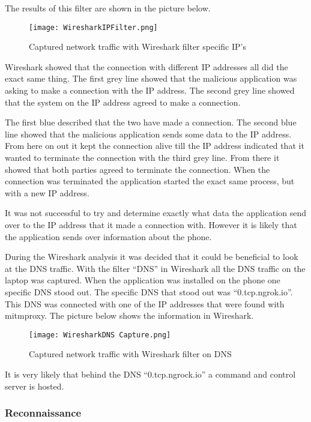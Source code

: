 The results of this filter are shown in the picture below.

\begin{figure}[H]
    \centering
    \texttt{[image: WiresharkIPFilter.png]}
    \caption{Captured network traffic with Wireshark filter specific IP's}
    \label{jordy-wiresharkfilter}
\end{figure}

Wireshark showed that the connection with different IP addresses all did the exact same thing. The first grey line showed that the malicious application was asking to make a connection with the IP address. The second grey line showed that the system on the IP address agreed to make a connection. 

The first blue described that the two have made a connection. The second blue line showed that the malicious application sends some data to the IP address. From here on out it kept the connection alive till the IP address indicated that it wanted to terminate the connection with the third grey line. From there it showed that both parties agreed to terminate the connection. When the connection was terminated the application started the exact same process, but with a new IP address.

\newpage
It was not successful to try and determine exactly what data the application send over to the IP address that it made a connection with. However it is likely that the application sends over information about the phone.

During the Wireshark analysis it was decided that it could be beneficial to look at the DNS traffic. With the filter “DNS” in Wireshark all the DNS traffic on the laptop was captured. When the application was installed on the phone one specific DNS stood out. The specific DNS that stood out was “0.tcp.ngrok.io”. This DNS was connected with one of the IP addresses that were found with mitmproxy. The picture below shows the information in Wireshark.

\begin{figure}[H]
    \centering
    \texttt{[image: WiresharkDNS Capture.png]}
    \caption{Captured network traffic with Wireshark filter on DNS}
    \label{jordy-wiresharkDNS}
\end{figure}

It is very likely that behind the DNS “0.tcp.ngrock.io” a command and control server is hosted.

\subsubsection{Reconnaissance}

